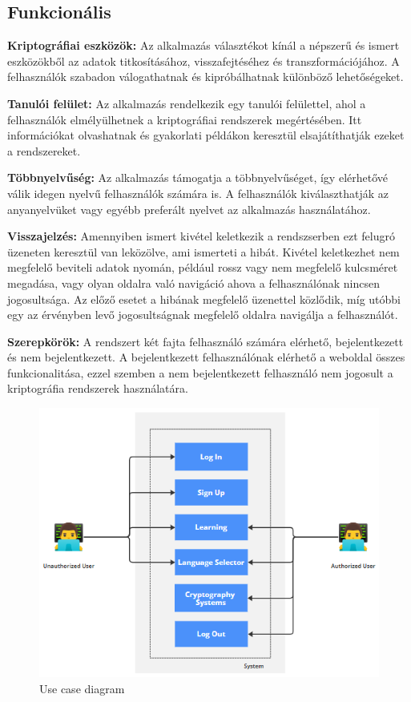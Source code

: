 \subsection{Funkcionális}
\textbf{Kriptográfiai eszközök:} Az alkalmazás választékot kínál a népszerű és ismert eszközökből az adatok titkosításához, visszafejtéséhez és transzformációjához. A felhasználók szabadon válogathatnak és kipróbálhatnak különböző lehetőségeket.

\textbf{Tanulói felület:} Az alkalmazás rendelkezik egy tanulói felülettel, ahol a felhasználók elmélyülhetnek a kriptográfiai rendszerek megértésében. Itt információkat olvashatnak és gyakorlati példákon keresztül elsajátíthatják ezeket a rendszereket.

\textbf{Többnyelvűség:} Az alkalmazás támogatja a többnyelvűséget, így elérhetővé válik idegen nyelvű felhasználók számára is. A felhasználók kiválaszthatják az anyanyelvüket vagy egyébb preferált nyelvet az alkalmazás használatához.

\textbf{Visszajelzés:} Amennyiben ismert kivétel keletkezik a rendszserben ezt felugró üzeneten keresztül van leközölve, ami ismerteti a hibát. Kivétel keletkezhet nem megfelelő beviteli adatok nyomán, például rossz vagy nem megfelelő kulcsméret megadása, vagy olyan oldalra való navigáció ahova a felhasználónak nincsen jogosultsága. Az előző esetet a hibának megfelelő üzenettel közlődik, míg utóbbi egy az érvényben levő jogosultságnak megfelelő oldalra navigálja a felhasználót.

\textbf{Szerepkörök:} A rendszert két fajta felhasználó számára elérhető, bejelentkezett és nem bejelentkezett. A bejelentkezett felhasználónak elérhető a weboldal összes funkcionalitása, ezzel szemben a nem bejelentkezett felhasználó nem jogosult a kriptográfia rendszerek használatára.

\begin{figure}[!h]
	\centering
	\includegraphics[scale=0.6]{images/UseCaseDiagram}
	\caption{Use case diagram}
\end{figure}


